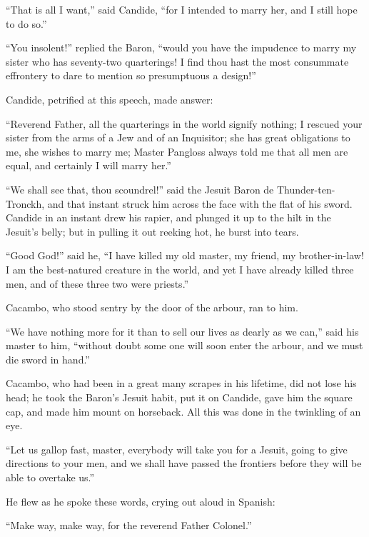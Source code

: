 ``That is all I want,'' said Candide, ``for I intended to marry her, and I still hope to do so.''

``You insolent!'' replied the Baron, ``would you have the impudence to marry my sister who has seventy-two quarterings! I find thou hast the most consummate effrontery to dare to mention so presumptuous a design!''

Candide, petrified at this speech, made answer:

``Reverend Father, all the quarterings in the world signify nothing; I rescued your sister from the arms of a Jew and of an Inquisitor; she has great obligations to me, she wishes to marry me; Master Pangloss always told me that all men are equal, and certainly I will marry her.''

``We shall see that, thou scoundrel!'' said the Jesuit Baron de Thunder-ten-Tronckh, and that instant struck him across the face with the flat of his sword. Candide in an instant drew his rapier, and plunged it up to the hilt in the Jesuit's belly; but in pulling it out reeking hot, he burst into tears.

``Good God!'' said he, ``I have killed my old master, my friend, my brother-in-law! I am the best-natured creature in the world, and yet I have already killed three men, and of these three two were priests.''

Cacambo, who stood sentry by the door of the arbour, ran to him.

``We have nothing more for it than to sell our lives as dearly as we can,'' said his master to him, ``without doubt some one will soon enter the arbour, and we must die sword in hand.''

Cacambo, who had been in a great many scrapes in his lifetime, did not lose his head; he took the Baron's Jesuit habit, put it on Candide, gave him the square cap, and made him mount on horseback. All this was done in the twinkling of an eye.

``Let us gallop fast, master, everybody will take you for a Jesuit, going to give directions to your men, and we shall have passed the frontiers before they will be able to overtake us.''

He flew as he spoke these words, crying out aloud in Spanish:

``Make way, make way, for the reverend Father Colonel.''

